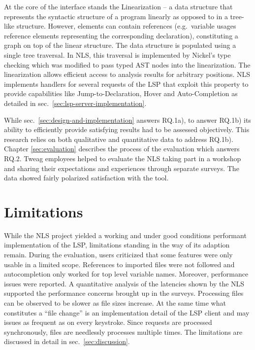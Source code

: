 \documentclass[
  a4paper,
  bibtex,
  english,
  nomenclature]{kthlatex/kththesis/kththesis}
\begin{document}
At the core of the interface stands the Linearization -- a data
structure that represents the syntactic structure of a program linearly
as opposed to in a tree-like structure. However, elements can contain
references (e.g.~variable usages reference elements representing the
corresponding declaration), constituting a graph on top of the linear
structure. The data structure is populated using a single tree
traversal. In NLS, this traversal is implemented by Nickel's type
checking which was modified to pass typed AST nodes into the
linearization. The linearization allows efficient access to analysis
results for arbitrary positions. NLS implements handlers for several
requests of the LSP that exploit this property to provide capabilities
like Jump-to-Declaration, Hover and Auto-Completion as detailed in
sec.~\ref{sec:lsp-server-implementation}.

While sec.~\ref{sec:design-and-implementation} answers RQ.1a), to answer
RQ.1b) its ability to efficiently provide satisfying results had to be
assessed objectively. This research relies on both qualitative and
quantitative data to address RQ.1b). Chapter \ref{sec:evaluation}
describes the process of the evaluation which answers RQ.2. Tweag
employees helped to evaluate the NLS taking part in a workshop and
sharing their expectations and experiences through separate surveys. The
data showed fairly polarized satisfaction with the tool.

\hypertarget{sec:limitations}{%
\section{Limitations}\label{sec:limitations}}

While the NLS project yielded a working and under good conditions
performant implementation of the LSP, limitations standing in the way of
its adaption remain. During the evaluation, users criticized that some
features were only usable in a limited scope. References to imported
files were not followed and autocompletion only worked for top level
variable names. Moreover, performance issues were reported. A
quantitative analysis of the latencies shown by the NLS supported the
performance concerns brought up in the surveys. Processing files can be
observed to be slower as file sizes increase. At the same time what
constitutes a ``file change'' is an implementation detail of the LSP
client and may issues as frequent as on every keystroke. Since requests
are processed synchronously, files are needlessly processes multiple
times. The limitations are discussed in detail in
sec.~\ref{sec:discussion}.
\end{document}
